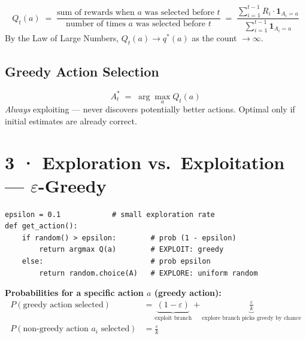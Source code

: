 \documentclass[11pt,a4paper]{article}
\begin{document}
\begin{tcolorbox}[defn={Estimated value of action $a$ at time $t$}]
\[
  Q_t(a) \;=\; \frac{\text{sum of rewards when } a \text{ was selected before } t}
                    {\text{number of times } a \text{ was selected before } t}
           \;=\; \frac{\sum_{i=1}^{t-1} R_i \cdot \mathbf{1}_{A_i=a}}
                      {\sum_{i=1}^{t-1} \mathbf{1}_{A_i=a}}
\]
By the Law of Large Numbers, $Q_t(a) \to q^*(a)$ as the count $\to \infty$.
\end{tcolorbox}

\subsection*{Greedy Action Selection}
\[
  A_t^* \;=\; \arg\max_a Q_t(a)
\]
\textit{Always} exploiting — never discovers potentially better actions. Optimal only if initial estimates
are already correct.

\section*{3 · Exploration vs.\ Exploitation — \(\varepsilon\)-Greedy}

\begin{tcolorbox}[bold={$\varepsilon$-Greedy Policy (Algorithm)}]
\begin{verbatim}
epsilon = 0.1            # small exploration rate
def get_action():
    if random() > epsilon:        # prob (1 - epsilon)
        return argmax Q(a)        # EXPLOIT: greedy
    else:                         # prob epsilon
        return random.choice(A)   # EXPLORE: uniform random
\end{verbatim}
\end{tcolorbox}

\textbf{Probabilities for a specific action $a$ (greedy action):}
\begin{align*}
  P(\text{greedy action selected}) &= \underbrace{(1-\varepsilon)}_{\text{exploit branch}}
    + \underbrace{\frac{\varepsilon}{k}}_{\text{explore branch picks greedy by chance}} \\[4pt]
  P(\text{non-greedy action } a_i \text{ selected}) &= \frac{\varepsilon}{k}
\end{align*}
\end{document}
